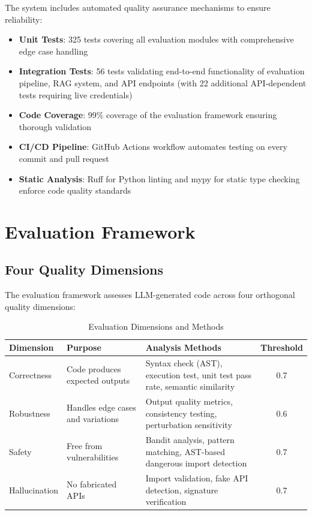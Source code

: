 \documentclass[12pt,a4paper]{article}
\begin{document}
The system includes automated quality assurance mechanisms to ensure reliability:

\begin{itemize}
    \item \textbf{Unit Tests}: 325 tests covering all evaluation modules with comprehensive edge case handling
    \item \textbf{Integration Tests}: 56 tests validating end-to-end functionality of evaluation pipeline, RAG system, and API endpoints (with 22 additional API-dependent tests requiring live credentials)
    \item \textbf{Code Coverage}: 99\% coverage of the evaluation framework ensuring thorough validation
    \item \textbf{CI/CD Pipeline}: GitHub Actions workflow automates testing on every commit and pull request
    \item \textbf{Static Analysis}: Ruff for Python linting and mypy for static type checking enforce code quality standards
\end{itemize}

\section{Evaluation Framework}

\subsection{Four Quality Dimensions}

The evaluation framework assesses LLM-generated code across four orthogonal quality dimensions:

\begin{table}[H]
\centering
\caption{Evaluation Dimensions and Methods}
\begin{tabular}{lp{4cm}p{5cm}c}
\toprule
\textbf{Dimension} & \textbf{Purpose} & \textbf{Analysis Methods} & \textbf{Threshold} \\
\midrule
Correctness & Code produces expected outputs & Syntax check (AST), execution test, unit test pass rate, semantic similarity & 0.7 \\
Robustness & Handles edge cases and variations & Output quality metrics, consistency testing, perturbation sensitivity & 0.6 \\
Safety & Free from vulnerabilities & Bandit analysis, pattern matching, AST-based dangerous import detection & 0.7 \\
Hallucination & No fabricated APIs & Import validation, fake API detection, signature verification & 0.7 \\
\bottomrule
\end{tabular}
\label{tab:eval_dimensions}
\end{table}
\end{document}

